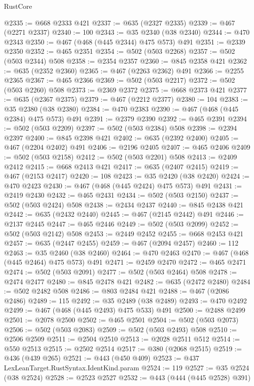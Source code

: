 \begin{lexlean}{RustCore}
\begin{coremodule}
@2335 := @668 @2333 @421
@2337 := @635 (@2327 @2335)
@2339 := @467 (@2271 @2337)
@2340 := 100
@2343 := @35 @2340 (@38 @2340)
@2344 := @470 @2343
@2350 := @467 (@468 (@445 @2344) @475 @573) @491
@2351 := @2339 @2350
@2352 := @465 @2351
@2354 := @502 (@503 @2268)
@2357 := @502 (@503 @2344) @508
@2358 := @2354 @2357
@2360 := @845 @2358 @421
@2362 := @635 (@2352 @2360)
@2365 := @467 (@2263 @2362) @491
@2366 := @2255 @2365
@2367 := @465 @2366
@2369 := @502 (@503 @2217)
@2372 := @502 (@503 @2260) @508
@2373 := @2369 @2372
@2375 := @668 @2373 @421
@2377 := @635 (@2367 @2375)
@2379 := @467 (@2212 @2377)
@2380 := 104
@2383 := @35 @2380 (@38 @2380)
@2384 := @470 @2383
@2390 := @467 (@468 (@445 @2384) @475 @573) @491
@2391 := @2379 @2390
@2392 := @465 @2391
@2394 := @502 (@503 @2209)
@2397 := @502 (@503 @2384) @508
@2398 := @2394 @2397
@2400 := @845 @2398 @421
@2402 := @635 (@2392 @2400)
@2405 := @467 (@2204 @2402) @491
@2406 := @2196 @2405
@2407 := @465 @2406
@2409 := @502 (@503 @2158)
@2412 := @502 (@503 @2201) @508
@2413 := @2409 @2412
@2415 := @668 @2413 @421
@2417 := @635 (@2407 @2415)
@2419 := @467 (@2153 @2417)
@2420 := 108
@2423 := @35 @2420 (@38 @2420)
@2424 := @470 @2423
@2430 := @467 (@468 (@445 @2424) @475 @573) @491
@2431 := @2419 @2430
@2432 := @465 @2431
@2434 := @502 (@503 @2150)
@2437 := @502 (@503 @2424) @508
@2438 := @2434 @2437
@2440 := @845 @2438 @421
@2442 := @635 (@2432 @2440)
@2445 := @467 (@2145 @2442) @491
@2446 := @2137 @2445
@2447 := @465 @2446
@2449 := @502 (@503 @2099)
@2452 := @502 (@503 @2142) @508
@2453 := @2449 @2452
@2455 := @668 @2453 @421
@2457 := @635 (@2447 @2455)
@2459 := @467 (@2094 @2457)
@2460 := 112
@2463 := @35 @2460 (@38 @2460)
@2464 := @470 @2463
@2470 := @467 (@468 (@445 @2464) @475 @573) @491
@2471 := @2459 @2470
@2472 := @465 @2471
@2474 := @502 (@503 @2091)
@2477 := @502 (@503 @2464) @508
@2478 := @2474 @2477
@2480 := @845 @2478 @421
@2482 := @635 (@2472 @2480)
@2484 := @502 @2482 @508
@2486 := @803 @2484 @421
@2488 := @467 (@2086 @2486)
@2489 := 115
@2492 := @35 @2489 (@38 @2489)
@2493 := @470 @2492
@2499 := @467 (@468 (@445 @2493) @475 @533) @491
@2500 := @2488 @2499
@2501 := @2078 @2500
@2502 := @465 @2501
@2504 := @502 (@503 @2073)
@2506 := @502 (@503 @2083)
@2509 := @502 (@503 @2493) @508
@2510 := @2506 @2509
@2511 := @2504 @2510
@2513 := @2028 @2511 @512
@2514 := @550 @2513
@2515 := @2502 @2514
@2517 := @380 (@2068 @2515)
@2519 := @436 (@439 @265)
@2521 := @443 (@450 @409)
@2523 := @437 LexLeanTarget.RustSyntax.IdentKind.param
@2524 := 119
@2527 := @35 @2524 (@38 @2524)
@2528 := @2523 @2527
@2532 := @443 (@444 (@445 @2528) @391)

\end{coremodule}
\end{lexlean}
